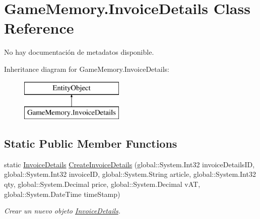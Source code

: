 \hypertarget{class_game_memory_1_1_invoice_details}{\section{Game\-Memory.\-Invoice\-Details Class Reference}
\label{class_game_memory_1_1_invoice_details}
}


No hay documentación de metadatos disponible.  


Inheritance diagram for Game\-Memory.\-Invoice\-Details\-:\begin{figure}[H]
\begin{center}
\leavevmode
\includegraphics[height=2.000000cm]{class_game_memory_1_1_invoice_details}
\end{center}
\end{figure}
\subsection*{Static Public Member Functions}
\begin{DoxyCompactItemize}
\item 
static \hyperlink{class_game_memory_1_1_invoice_details}{Invoice\-Details} \hyperlink{class_game_memory_1_1_invoice_details_a857f5e20931749e50ad2892c99c4fd70}{Create\-Invoice\-Details} (global\-::\-System.\-Int32 invoice\-Details\-I\-D, global\-::\-System.\-Int32 invoice\-I\-D, global\-::\-System.\-String article, global\-::\-System.\-Int32 qty, global\-::\-System.\-Decimal price, global\-::\-System.\-Decimal v\-A\-T, global\-::\-System.\-Date\-Time time\-Stamp)
\begin{DoxyCompactList}\small\item\em Crear un nuevo objeto \hyperlink{class_game_memory_1_1_invoice_details}{Invoice\-Details}. \end{DoxyCompactList}\end{DoxyCompactItemize}
